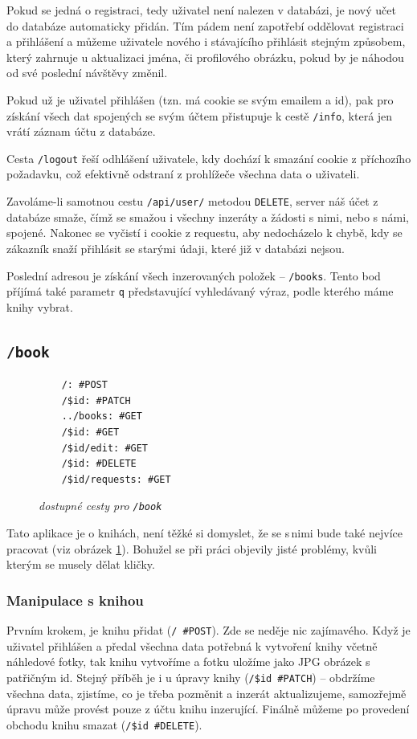 \documentclass[a4paper,oneside,12pt]{report}
\begin{document}
Pokud se jedná o registraci, tedy uživatel není nalezen v\,\,databázi, je nový učet do
databáze automaticky přidán. Tím pádem není zapotřebí oddělovat registraci a přihlášení a
můžeme uživatele nového i stávajícího přihlásit stejným způsobem, který zahrnuje u
aktualizaci jména, či profilového obrázku, pokud by je náhodou od své poslední návštěvy
změnil.

Pokud už je uživatel přihlášen (tzn. má cookie se svým emailem a id), pak pro získání
všech dat spojených se svým účtem přistupuje k cestě \texttt{/info}, která jen
vrátí záznam účtu z databáze.

Cesta \texttt{/logout} řeší odhlášení uživatele, kdy dochází k smazání cookie z
příchozího požadavku, což efektivně odstraní z prohlížeče všechna data o uživateli.

Zavoláme-li samotnou cestu \texttt{/api/user/} metodou \texttt{DELETE}, server
náš účet z databáze smaže, čímž se smažou i všechny inzeráty a žádosti s nimi, nebo s
námi, spojené. Nakonec se vyčistí i cookie z requestu, aby nedocházelo k chybě, kdy se
zákazník snaží přihlásit se starými údaji, které již v databázi nejsou.

Poslední adresou je získání všech inzerovaných položek -- \texttt{/books}. Tento
bod příjímá také parametr \texttt{q} představující vyhledávaný výraz, podle
kterého máme knihy vybrat.

\subsection{\texttt{/book}}
\begin{figure}
	\vspace{-6.5mm}
	\caption{\textit{dostupné cesty pro \texttt{/book}}}\label{fig:/book}
	\vspace{-6.5mm}
	\begin{verbatim}
	/: #POST
	/$id: #PATCH
	../books: #GET
	/$id: #GET
	/$id/edit: #GET
	/$id: #DELETE
	/$id/requests: #GET
  \end{verbatim}
\end{figure}

Tato aplikace je o knihách, není těžké si domyslet, že se s\,nimi bude také nejvíce
pracovat (viz obrázek \ref{fig:/book}). Bohužel se při práci objevily jisté
problémy, kvůli kterým se musely dělat kličky.

\subsubsection{Manipulace s knihou}
Prvním krokem, je knihu přidat (\texttt{/ \#POST}). Zde se neděje nic zajímavého.
Když je uživatel přihlášen a předal všechna data potřebná k vytvoření knihy včetně
náhledové fotky, tak knihu vytvoříme a fotku uložíme jako JPG obrázek s patřičným id.
Stejný příběh je i u úpravy knihy (\texttt{/\$id \#PATCH}) -- obdržíme všechna data,
zjistíme, co je třeba pozměnit a\,\,inzerát aktualizujeme, samozřejmě úpravu může provést
pouze z účtu knihu inzerující. Finálně můžeme po provedení obchodu knihu smazat
(\texttt{/\$id \#DELETE}).
\end{document}
